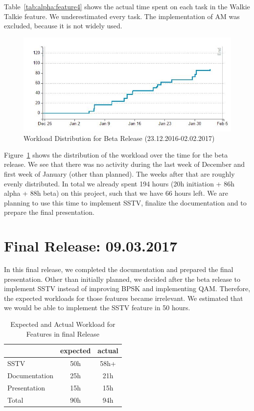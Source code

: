 Table~\ref{tab:alpha:feature4} shows the actual time spent on each task in the Walkie Talkie feature. We underestimated every task. The implementation of AM was excluded, because it is not widely used. 

\begin{figure}[!htbp]
	\centering
	\includegraphics[width=1\linewidth]{gfx/Agilefant_Beta.jpg}
	\caption{Workload Distribution for Beta Release (23.12.2016-02.02.2017)}
	\label{fig:agilefant_beta}
\end{figure}

Figure~\ref{fig:agilefant_beta} shows the distribution of the workload over the time for the beta release. We see that there was no activity during the last week of December and first week of January (other than planned). The weeks after that are roughly evenly distributed. 
In total we already spent 194 hours (20h initiation + 86h alpha + 88h beta) on this project, such that we have 66 hours left. We are planning to use this time to implement \ac{SSTV}, finalize the documentation and to prepare the final presentation. 



\section{Final Release: 09.03.2017}
\label{sec:progress:final}




In this final release, we completed the documentation and prepared the final presentation. Other than initially planned, we decided after the beta release to implement \ac{SSTV} instead of improving \ac{BPSK} and implementing \ac{QAM}. Therefore, the expected workloads for those features became irrelevant. We estimated that we would be able to implement the SSTV feature in 50 hours.
\begin{table}[!htbp]
	\centering
	\caption{Expected and Actual Workload for Features in final Release}
	\label{tab:final:features}
	\begin{tabular}{ l | c | c }
		& expected  & actual \\ \hline
		SSTV & 50h & 58h+ \\  \hline
		Documentation & 25h & 21h \\ \hline \hline
		Presentation & 15h & 15h \\ \hline \hline 
		Total & 90h & 94h  
	\end{tabular}
\end{table}

